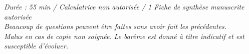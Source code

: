 \documentclass[noCustomPackages, basic,ds]{UPSTI_Document}
\newif\ifavecEspaceReponse
\newcommand{\cartoucheNom}{%
  \ifavecEspaceReponse
    \noindent\fbox{%
      \begin{minipage}{.95\linewidth}
        Nom, prénom et groupe :
        \vspace*{.5cm}\dotfill
        \vspace*{1mm}
      \end{minipage}%
    }%
    \vspace{1em}%
  \fi
}
\begin{document}
\cartoucheNom

\begin{center}
    \textit{Durée : 55 min / Calculatrice non autorisée / 1 Fiche de synthèse manuscrite autorisée}\\
    \textit{Beaucoup de questions peuvent être faites sans avoir fait les précédentes.}\\
    \textit{Malus en cas de copie non soignée.}
    \textit{Le barême est donné à titre indicatif et est susceptible d'évoluer.}
\end{center}







\end{document}
